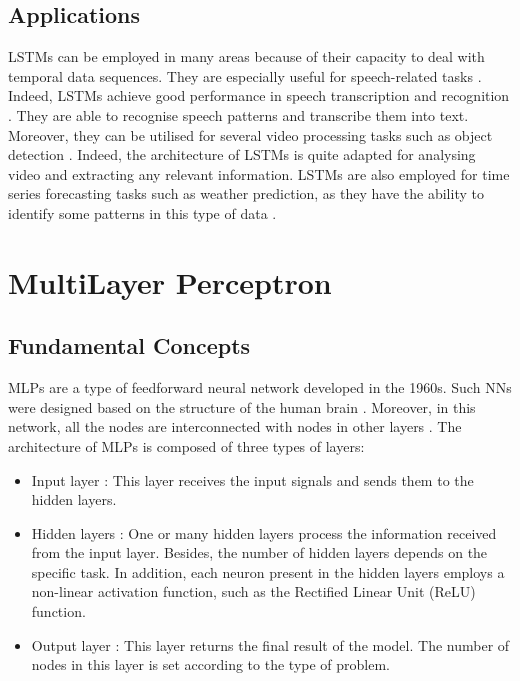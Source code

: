 \documentclass[12pt,oneside]{book} %
\begin{document}
\subsection{Applications}

\noindent LSTMs can be employed in many areas because of their capacity to deal with temporal data sequences. They are especially useful for speech-related tasks \cite{LSTM1}. Indeed, LSTMs achieve good performance in speech transcription and recognition \cite{LSTM1}. They are able to recognise speech patterns and transcribe them into text. Moreover, they can be utilised for several video processing tasks such as object detection \cite{LSTM1}. Indeed, the architecture of LSTMs is quite adapted for analysing video and extracting any relevant information. LSTMs are also employed for time series forecasting tasks such as weather prediction, as they have the ability to identify some patterns in this type of data \cite{LSTM1}.

\section{MultiLayer Perceptron}

\subsection{Fundamental Concepts}

\noindent MLPs are a type of feedforward neural network developed in the 1960s. Such NNs were designed based on the structure of the human brain \cite{MLP2}. Moreover, in this network, all the nodes are interconnected with nodes in other layers \citep{MLP1,MLP2,MLP3}. The architecture of MLPs is composed of three types of layers: 
\begin{itemize}
    \item Input layer \citep{MLP1,MLP3}: This layer receives the input signals and sends them to the hidden layers.
    \item Hidden layers \citep{MLP1,MLP3}: One or many hidden layers process the information received from the input layer. Besides, the number of hidden layers depends on the specific task. In addition, each neuron present in the hidden layers employs a non-linear activation function, such as the Rectified Linear Unit (ReLU) function. 
    \item Output layer \citep{MLP1,MLP3}: This layer returns the final result of the model. The number of nodes in this layer is set according to the type of problem.
\end{itemize}
 
\end{document}
